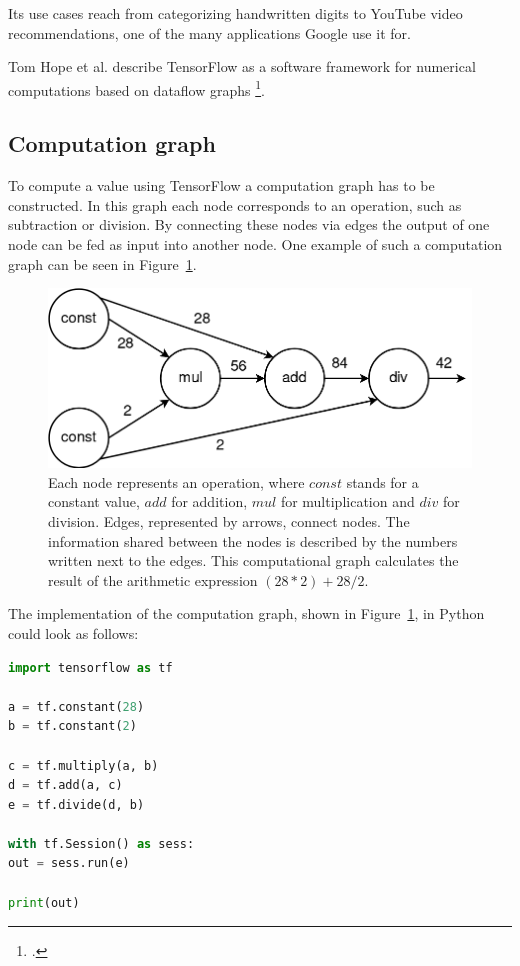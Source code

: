 Its use cases reach from categorizing handwritten digits to YouTube video recommendations, one of the many applications Google use it for.

Tom Hope et al. describe TensorFlow as a software framework for numerical computations based on dataflow graphs \footcite[page 6]{Hope_Learning_TensorFlow}.

\subsection{Computation graph}
To compute a value using TensorFlow a computation graph has to be constructed. In this graph each node corresponds to an operation, such as subtraction or division. By connecting these nodes via edges the output of one node can be fed as input into another node. One example of such a computation graph can be seen in Figure~\ref{pic:methodology_tensorflow_computationGraph}.

\begin{figure}[h!]
	\centering
	\includegraphics[width=4.5in]{img/methodology_tensorflow_computationGraph.png}
	\caption{Each node represents an operation, where $const$ stands for a constant value, $add$ for addition, $mul$ for multiplication and $div$ for division. Edges, represented by arrows, connect nodes. The information shared between the nodes is described by the numbers written next to the edges. This computational graph calculates the result of the arithmetic expression $(28 * 2) + 28 / 2$.}
	\label{pic:methodology_tensorflow_computationGraph}
\end{figure}

The implementation of the computation graph, shown in Figure~\ref{pic:methodology_tensorflow_computationGraph}, in Python could look as follows:

\begin{lstlisting}[language=python]
import tensorflow as tf

a = tf.constant(28)
b = tf.constant(2)

c = tf.multiply(a, b)
d = tf.add(a, c)
e = tf.divide(d, b)

with tf.Session() as sess:
out = sess.run(e)

print(out)
\end{lstlisting}

